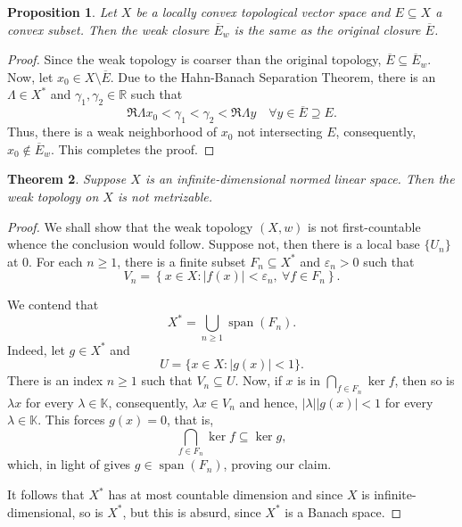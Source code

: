 \documentclass[11pt]{article}
\theoremstyle{thmstyle}
\newtheorem{theorem}{Theorem}[section]
\newtheorem{proposition}[theorem]{Proposition}
\theoremstyle{defstyle}
\newcommand{\R}{\mathbb{R}}
\newcommand{\bbC}{\mathbb{C}}
\newcommand{\K}{\mathbb{K}} %
\renewcommand{\ge}{\geqslant}
\begin{document}
\begin{proposition}
    Let $X$ be a locally convex topological vector space and $E\subseteq X$ a convex subset. Then the weak closure $\overline E_w$ is the same as the original closure $\overline E$.
\end{proposition}
\begin{proof}
    Since the weak topology is coarser than the original topology, $\overline E\subseteq\overline E_w$. Now, let $x_0\in X\setminus\overline E$. Due to the Hahn-Banach Separation Theorem, there is an $\Lambda\in X^\ast$ and $\gamma_1,\gamma_2\in\R$ such that 
    \begin{equation*}
        \Re \Lambda x_0 < \gamma_1 < \gamma_2 < \Re\Lambda y\quad\forall y\in\overline E\supseteq E.
    \end{equation*}
    Thus, there is a weak neighborhood of $x_0$ not intersecting $E$, consequently, $x_0\notin\overline E_w$. This completes the proof.
\end{proof}


\begin{theorem}
    Suppose $X$ is an infinite-dimensional normed linear space. Then the weak topology on $X$ is not metrizable.
\end{theorem}
\begin{proof}
    We shall show that the weak topology $(X, w)$ is not first-countable whence the conclusion would follow. Suppose not, then there is a local base $\{U_n\}$ at $0$. For each $n\ge 1$, there is a finite subset $F_n\subseteq X^\ast$ and $\varepsilon_n > 0$ such that 
    \begin{equation*}
        V_n = \left\{x\in X\colon |f(x)| < \varepsilon_n,~\forall f\in F_n\right\}.
    \end{equation*}

    We contend that 
    \begin{equation*}
        X^\ast = \bigcup_{n\ge 1} \operatorname{span}(F_n).
    \end{equation*}
    Indeed, let $g\in X^\ast$ and 
    \begin{equation*}
        U = \{x\in X\colon |g(x)| < 1\}.
    \end{equation*}
    There is an index $n\ge 1$ such that $V_n\subseteq U$. Now, if $x$ is in $\bigcap\limits_{f\in F_n}\ker f$, then so is $\lambda x$ for every $\lambda\in\K$, consequently, $\lambda x\in V_n$ and hence, $|\lambda||g(x)| < 1$ for every $\lambda\in\K$. This forces $g(x) = 0$, that is, 
    \begin{equation*}
        \bigcap_{f\in F_n}\ker f\subseteq\ker g,
    \end{equation*}
    which, in light of  gives $g\in\operatorname{span}(F_n)$, proving our claim.

    It follows that $X^\ast$ has at most countable dimension and since $X$ is infinite-dimensional, so is $X^\ast$, but this is absurd, since $X^\ast$ is a Banach space.
\end{proof}
\end{document}
